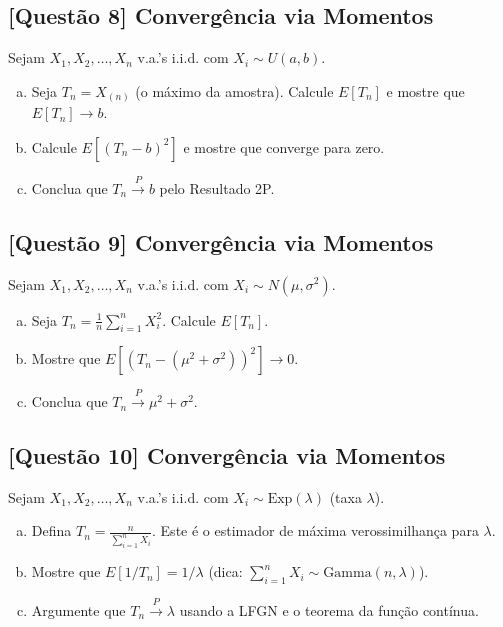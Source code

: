 \documentclass[12pt,a4paper]{article}
\begin{document}
\subsection*{[Questão 8] Convergência via Momentos}

Sejam $X_1, X_2, \ldots, X_n$ v.a.'s i.i.d. com $X_i \sim U(a, b)$.

\begin{enumerate}[(a)]
    \item Seja $T_n = X_{(n)}$ (o máximo da amostra). Calcule $E[T_n]$ e mostre que $E[T_n] \to b$.
    \item Calcule $E[(T_n - b)^2]$ e mostre que converge para zero.
    \item Conclua que $T_n \xrightarrow{P} b$ pelo Resultado 2P.
\end{enumerate}

\subsection*{[Questão 9] Convergência via Momentos}

Sejam $X_1, X_2, \ldots, X_n$ v.a.'s i.i.d. com $X_i \sim N(\mu, \sigma^2)$.

\begin{enumerate}[(a)]
    \item Seja $T_n = \frac{1}{n}\sum_{i=1}^n X_i^2$. Calcule $E[T_n]$.
    \item Mostre que $E[(T_n - (\mu^2 + \sigma^2))^2] \to 0$.
    \item Conclua que $T_n \xrightarrow{P} \mu^2 + \sigma^2$.
\end{enumerate}

\subsection*{[Questão 10] Convergência via Momentos}

Sejam $X_1, X_2, \ldots, X_n$ v.a.'s i.i.d. com $X_i \sim \text{Exp}(\lambda)$ (taxa $\lambda$).

\begin{enumerate}[(a)]
    \item Defina $T_n = \frac{n}{\sum_{i=1}^n X_i}$. Este é o estimador de máxima verossimilhança para $\lambda$.
    \item Mostre que $E[1/T_n] = 1/\lambda$ (dica: $\sum_{i=1}^n X_i \sim \text{Gamma}(n, \lambda)$).
    \item Argumente que $T_n \xrightarrow{P} \lambda$ usando a LFGN e o teorema da função contínua.
\end{enumerate}
\end{document}
